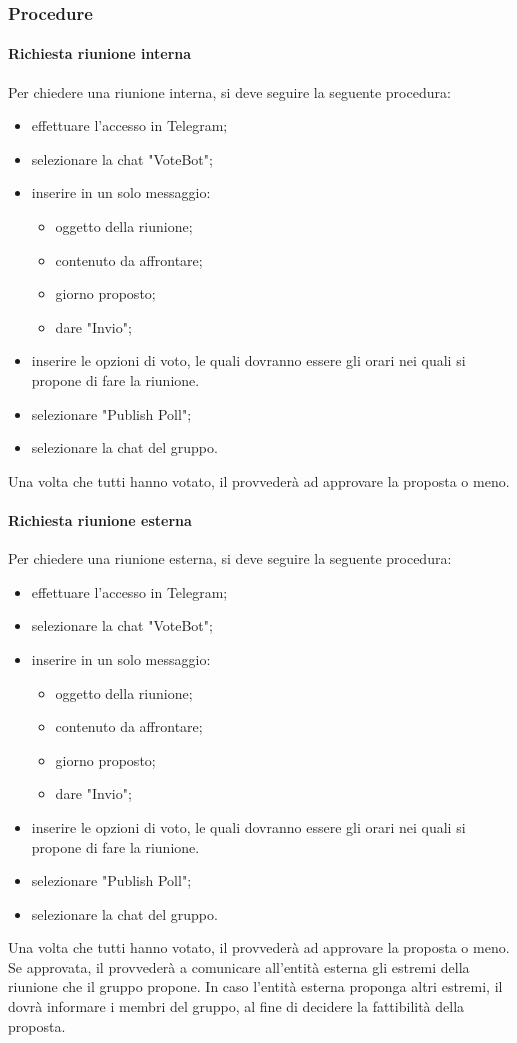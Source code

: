  \subsubsection{Procedure}
 \paragraph{Richiesta riunione interna}
 Per chiedere una riunione interna, si deve seguire la seguente procedura:
 \begin{itemize}
 	\item effettuare l'accesso in Telegram;
 	\item selezionare la chat "VoteBot";
 	\item inserire in un solo messaggio:
 	\begin{itemize}
 		\item oggetto della riunione;
 		\item contenuto da affrontare;
	 	\item giorno proposto;
	 	\item dare "Invio";
 	\end{itemize}
 	\item inserire le opzioni di voto, le quali dovranno essere gli orari nei quali si propone di fare la riunione.
 	\item selezionare "Publish Poll";
 	\item selezionare la chat del gruppo.
 \end{itemize}
 Una volta che tutti hanno votato, il \RESP{} provvederà ad approvare la proposta o meno.
 \paragraph{Richiesta riunione esterna}
 Per chiedere una riunione esterna, si deve seguire la seguente procedura:
 \begin{itemize}
 	\item effettuare l'accesso in Telegram;
 	\item selezionare la chat "VoteBot";
 	\item inserire in un solo messaggio:
 	\begin{itemize}
 		\item oggetto della riunione;
 		\item contenuto da affrontare;
 		\item giorno proposto;
 		\item dare "Invio";
 	\end{itemize}
 	\item inserire le opzioni di voto, le quali dovranno essere gli orari nei quali si propone di fare la riunione.
 	\item selezionare "Publish Poll";
 	\item selezionare la chat del gruppo.
 \end{itemize}
 Una volta che tutti hanno votato, il \RESP{} provvederà ad approvare la proposta o meno. \\
 Se approvata, il \RESP{} provvederà a comunicare all'entità esterna gli estremi della riunione che il gruppo propone. In caso l'entità esterna proponga altri estremi, il \RESP{} dovrà informare i membri del gruppo, al fine di decidere la fattibilità della proposta.
